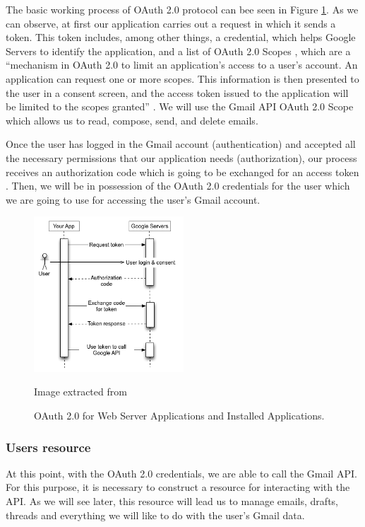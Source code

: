 The basic working process of OAuth 2.0 protocol can bee seen in Figure \ref{fig:oauth}. As we can observe, at first our application carries out a request in which it sends a token. This token includes, among other things, a credential, which helps Google Servers  to identify the application, and a list of OAuth 2.0 Scopes \citep{oauth-scopes-google}, which are a ``mechanism  in OAuth 2.0 to limit an application's access to a user's account. An application can request one or more scopes. This information is then presented to the user in a consent screen, and the access token issued to the application will be limited to the scopes granted'' \citep{oauth-scopes}. We will use the Gmail API OAuth 2.0 Scope which allows us to read, compose, send, and delete emails.

Once the user has logged in the Gmail account (authentication) and accepted all the necessary permissions that our application needs (authorization), our process receives an authorization code which is going to be exchanged for an access token \citep{oauth-exchange}. Then, we will be in possession of the OAuth 2.0 credentials for the user \citep{oauth2.credentials} which we are going to use for accessing the user's Gmail account.

\begin{figure}[h]
	\centering%
	\includegraphics[width = 0.5\textwidth]{Imagenes/Bitmap/webflow.png}%
	\caption{OAuth 2.0 for Web Server Applications and Installed Applications.}%
	Image extracted from \cite{oauthforgoogle}
	\label{fig:oauth}
\end{figure}

\subsubsection{Users resource}\label{sssect:usersres}
At this point, with the OAuth 2.0 credentials, we are able to call the Gmail API. For this purpose, it is necessary to construct a resource \citep[/v1/reference]{gmailAPI} for interacting with the API. As we will see later, this resource will lead us to manage emails, drafts, threads and everything we will like to do with the user's Gmail data.

